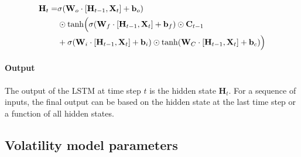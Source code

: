 \documentclass[letterpaper,11pt]{article}
\begin{document}
\begin{align}
    \mathbf{H}_t = & \sigma(\mathbf{W}_o \cdot [\mathbf{H}_{t-1}, \mathbf{X}_t] + \mathbf{b}_o) \nonumber \\
    & \odot \tanh\Bigl(\sigma(\mathbf{W}_f \cdot [\mathbf{H}_{t-1}, \mathbf{X}_t] + \mathbf{b}_f) \odot \mathbf{C}_{t-1} \nonumber \\
    & + \sigma(\mathbf{W}_i \cdot [\mathbf{H}_{t-1}, \mathbf{X}_t] + \mathbf{b}_i) \odot \tanh(\mathbf{W}_C \cdot [\mathbf{H}_{t-1}, \mathbf{X}_t] + \mathbf{b}_c)\Bigr)
\end{align}



    

\paragraph*{Output}
The output of the LSTM at time step \( t \) is the hidden state \(\mathbf{H}_t\). For a sequence of inputs, the final output can be based on the hidden state at the last time step or a function of all hidden states.








\newpage
\begin{center}
    \subsection*{Volatility model parameters}
\end{center}
\end{document}
